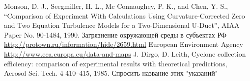 \documentclass[pdftex,a4paper,12pt]{article}
\begin{document}
\newpage
\begin{thebibliography}{9}


 Monson, D. J., Seegmiller, H. L., Mc Connaughey, P. K., and Chen, Y. S., “Comparison of Experiment With Calculations Using Curvature-Corrected Zero and Two Equation Turbulence Models for a Two-Dimensional U-Duct”, AIAA Paper No. 90-1484, 1990.
 Загрязнение окружающей среды в субъектах РФ\\
\url{http://protown.ru/information/hide/2659.html}
 European Environment Agency\\
\url{http://www.eea.europa.eu/data-and-maps}
 J. Dirgo, D. Leith, Cyclone collection efficiency: comparison of experimental results with theoretical predictions, Aerosol Sci. Tech. 4 410–415, 1985.
 Спросить название этих "указаний"
\end{thebibliography}
\end{document}
